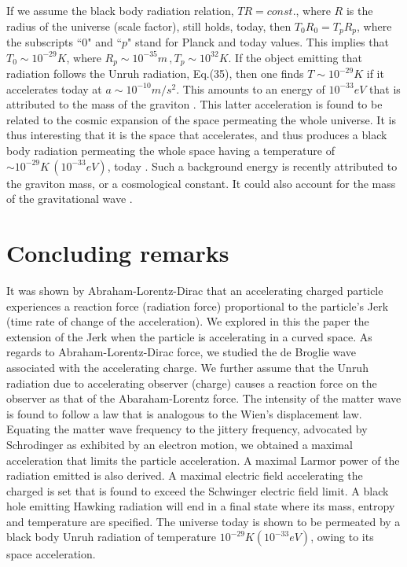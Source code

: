 \documentclass[12pt]{article}
\begin{document}
If we assume the black body radiation relation, $TR=const.$, where $R$ is the radius of the universe (scale factor),  still holds, today, then $T_0R_0=T_pR_p$, where the subscripts ``0" and ``$p$" stand for Planck and today values. This implies that $T_0\sim 10^{-29}K$, where $R_p\sim 10^{-35}m\,, T_p\sim 10^{32}K$. If the object emitting that radiation follows the Unruh radiation, Eq.(35), then one finds $T\sim 10^{-29}K$ if it accelerates today at $a\sim 10^{-10}m/s^2$. This  amounts to an energy of $10^{-33}eV$ that is attributed to the mass of the graviton {\cite{mass1,mass2}}. This latter acceleration is found to be related to the cosmic expansion of the space permeating the whole universe. It is thus interesting that it is the space that accelerates, and thus produces a black body radiation permeating the whole space having a temperature of $\sim 10^{-29}K  \,(10^{-33}eV)$, today {\cite{quantum_arbab,caroll}}.  Such a background energy is recently attributed to the graviton mass, or a cosmological constant. It could also account for the mass of the gravitational wave {\cite{graviton}}.


\section{{Concluding remarks}}

It was shown by Abraham-Lorentz-Dirac that an accelerating charged particle experiences a reaction force (radiation force) proportional to the particle's Jerk (time rate of change of the acceleration). We explored in this the paper the extension of the Jerk when the particle is accelerating in a curved space. As regards to Abraham-Lorentz-Dirac force, we studied the de Broglie wave associated with the accelerating charge. We further assume that the Unruh radiation due to accelerating observer (charge) causes a reaction force on the observer as that of the Abaraham-Lorentz force. The intensity of the matter wave is found to follow a law that is  analogous to  the Wien's displacement law. Equating the matter wave frequency to the jittery frequency, advocated by Schrodinger as exhibited by an electron motion, we obtained a maximal acceleration that limits the particle acceleration. A maximal  Larmor power of the radiation emitted is also derived. A maximal electric field accelerating the charged is set that is found to exceed the Schwinger electric field limit. A black hole emitting Hawking radiation will end in a final state where its mass, entropy and temperature are specified. The universe today is shown to be permeated by a black body Unruh radiation of temperature $10^{-29}K (10^{-33}eV)$, owing to its space acceleration.
\end{document}
